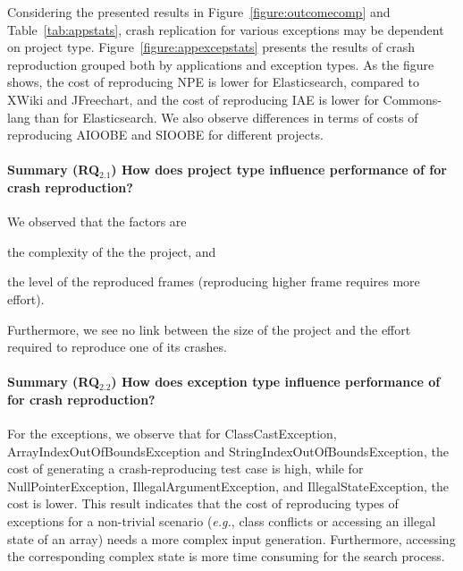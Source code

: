 Considering the presented results in Figure~\ref{figure:outcomecomp} and Table~\ref{tab:appstats}, crash replication for various exceptions may be dependent on project type.
Figure~\ref{figure:appexcepstats} presents the results of crash reproduction grouped both by applications and exception types.
%
As the figure shows, the cost of reproducing NPE is lower for Elasticsearch, compared to XWiki and JFreechart, and the cost of reproducing IAE is lower for Commons-lang than for Elasticsearch.
We also observe differences in terms of costs of reproducing AIOOBE and SIOOBE for different projects.


\paragraph{\textbf{Summary (RQ$_{2.1}$)} How does project type influence performance of \evocrash for crash reproduction?}


We observed that the factors are 
\begin{inparaenum}[(i)]
\item the complexity of the the project, and 
\item the level of the reproduced frames (reproducing higher frame requires more effort).
\end{inparaenum}
Furthermore, we see no link between the size of the project and the effort required to reproduce one of its crashes.


\paragraph{\textbf{Summary (RQ$_{2.2}$)} How does exception type influence performance of \evocrash for crash reproduction?}

For the exceptions, we observe that for ClassCastException, ArrayIndexOutOfBoundsException and StringIndexOutOfBoundsException, the cost of generating a crash-reproducing test case is high, while for NullPointerException, IllegalArgumentException, and IllegalStateException, the cost is lower.
This result indicates that the cost of reproducing types of exceptions for a non-trivial scenario (\textit{e.g.}, class conflicts or accessing an illegal state of an array) needs a more complex input generation. Furthermore, accessing the corresponding complex state is more time consuming for the search process.

